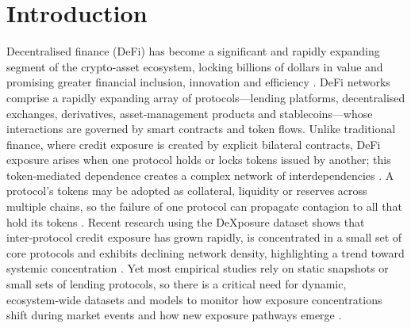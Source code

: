 \section{Introduction}

Decentralised finance (DeFi) has become a significant and rapidly expanding segment of the crypto‑asset ecosystem, locking billions of dollars in value and promising greater financial inclusion, innovation and efficiency \cite{Adamyk2025}.  DeFi networks comprise a rapidly expanding array of protocols—lending platforms, decentralised exchanges, derivatives, asset‑management products and stablecoins—whose interactions are governed by smart contracts and token flows.  Unlike traditional finance, where credit exposure is created by explicit bilateral contracts, DeFi exposure arises when one protocol holds or locks tokens issued by another; this token‑mediated dependence creates a complex network of interdependencies \cite{DeXposure2025}.  A protocol’s tokens may be adopted as collateral, liquidity or reserves across multiple chains, so the failure of one protocol can propagate contagion to all that hold its tokens \cite{DeXposure2025}.  Recent research using the DeXposure dataset shows that inter‑protocol credit exposure has grown rapidly, is concentrated in a small set of core protocols and exhibits declining network density, highlighting a trend toward systemic concentration \cite{DeXposure2025}.  Yet most empirical studies rely on static snapshots or small sets of lending protocols, so there is a critical need for dynamic, ecosystem‑wide datasets and models to monitor how exposure concentrations shift during market events and how new exposure pathways emerge \cite{DeXposure2025}.


